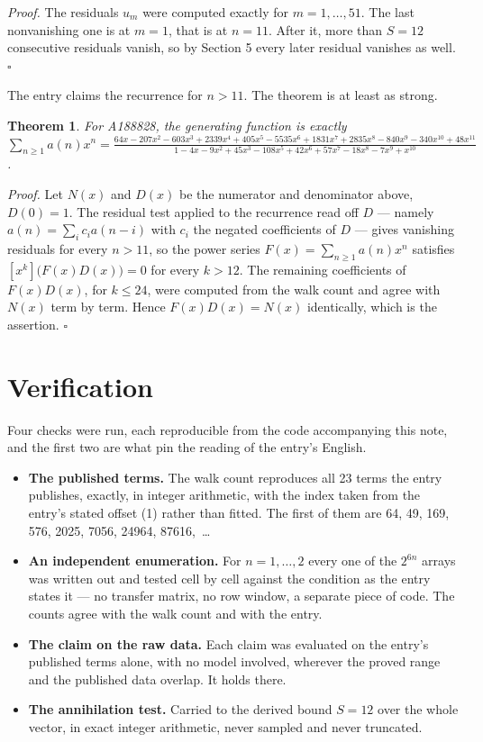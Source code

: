 \documentclass[11pt]{article}
\newtheorem{theorem}{Theorem}
\theoremstyle{definition}
\begin{document}
{\itshape Proof.} The residuals $u_m$ were computed exactly for $m = 1,\dots,51$. The last nonvanishing one is at $m = 1$, that is at $n = 11$. After it, more than $S = 12$ consecutive residuals vanish, so by Section 5 every later residual vanishes as well. $\square$

The entry claims the recurrence for $n > 11$. The theorem is at least as strong.

\begin{theorem} For A188828, the generating function is exactly $\sum_{n\ge 1} a(n)x^n = \frac{64x - 207x^{2} - 603x^{3} + 2339x^{4} + 405x^{5} - 5535x^{6} + 1831x^{7} + 2835x^{8} - 840x^{9} - 340x^{10} + 48x^{11}}{1 - 4x - 9x^{2} + 45x^{3} - 108x^{5} + 42x^{6} + 57x^{7} - 18x^{8} - 7x^{9} + x^{10}}$.\end{theorem}

{\itshape Proof.} Let $N(x)$ and $D(x)$ be the numerator and denominator above, $D(0)=1$. The residual test applied to the recurrence read off $D$ --- namely $a(n) = \sum_i c_i a(n-i)$ with $c_i$ the negated coefficients of $D$ --- gives vanishing residuals for every $n > 11$, so the power series $F(x)=\sum_{n\ge 1}a(n)x^n$ satisfies $[x^k]\bigl(F(x)D(x)\bigr) = 0$ for every $k > 12$. The remaining coefficients of $F(x)D(x)$, for $k \le 24$, were computed from the walk count and agree with $N(x)$ term by term. Hence $F(x)D(x) = N(x)$ identically, which is the assertion. $\square$

\section{Verification}

Four checks were run, each reproducible from the code accompanying this note, and the first two are what pin the reading of the entry's English.

\begin{itemize}

\item {\bfseries The published terms.} The walk count reproduces all 23 terms the entry publishes, exactly, in integer arithmetic, with the index taken from the entry's stated offset (1) rather than fitted. The first of them are 64, 49, 169, 576, 2025, 7056, 24964, 87616,~\dots

\item {\bfseries An independent enumeration.} For $n = 1,\dots,2$ every one of the $2^{6n}$ arrays was written out and tested cell by cell against the condition as the entry states it --- no transfer matrix, no row window, a separate piece of code. The counts agree with the walk count and with the entry.

\item {\bfseries The claim on the raw data.} Each claim was evaluated on the entry's published terms alone, with no model involved, wherever the proved range and the published data overlap. It holds there.

\item {\bfseries The annihilation test.} Carried to the derived bound $S = 12$ over the whole vector, in exact integer arithmetic, never sampled and never truncated.

\end{itemize}
\end{document}
